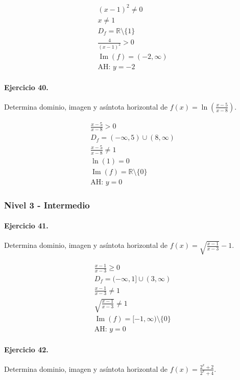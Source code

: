 \documentclass[11pt,a4paper]{article}
\begin{document}
\[
\begin{aligned}
(x-1)^2\ne0\\
x\ne 1\\
D_f=\mathbb{R}\setminus\{1\}\\
\frac{4}{(x-1)^2}>0\\
\operatorname{Im}(f)=(-2,\infty)\\
\text{AH: }y=-2
\end{aligned}
\]


\paragraph{Ejercicio 40.} Determina dominio, imagen y asíntota horizontal de $f(x)=\ln\left(\frac{x-5}{x-8}\right)$.

\[
\begin{aligned}
\frac{x-5}{x-8} >0\\
D_f=(-\infty,5)\cup(8,\infty)\\
\frac{x-5}{x-8}\ne1\\
\ln(1)=0\\
\operatorname{Im}(f)=\mathbb{R}\setminus\{0\}\\
\text{{AH: }}y=0
\end{aligned}
\]


\newpage

\subsubsection*{Nivel 3 - Intermedio}

\paragraph{Ejercicio 41.} Determina dominio, imagen y asíntota horizontal de $f(x)=\sqrt{\frac{x-1}{x-3}}-1$.

\[
\begin{aligned}
\frac{x-1}{x-3}\ge0\\
D_f=(-\infty,1]\cup(3,\infty)\\
\frac{x-1}{x-3}\ne1\\
\sqrt{\frac{x-1}{x-3}}\ne1\\
\operatorname{Im}(f)=[-1,\infty)\setminus\{0\}\\
\text{AH: }y=0
\end{aligned}
\]


\paragraph{Ejercicio 42.} Determina dominio, imagen y asíntota horizontal de $f(x)=\frac{2^x+2}{2^x+4}$. 
\end{document}
